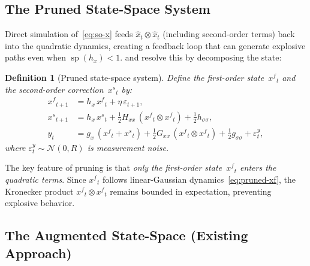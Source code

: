 \documentclass[12pt,a4paper]{article}
\newtheorem{definition}[theorem]{Definition}
\newcommand{\kron}{\otimes}
\newcommand{\xf}{{x^{f}}}
\newcommand{\xs}{{x^{s}}}
\newcommand{\gx}{g_x}
\newcommand{\hx}{h_x}
\newcommand{\Gxx}{G_{xx}}
\newcommand{\Hxx}{H_{xx}}
\newcommand{\gss}{{g_{\sigma\sigma}}}
\newcommand{\hsig}{{h_{\sigma\sigma}}}
\DeclareMathOperator{\specrad}{sp}
\begin{document}
\subsection{The Pruned State-Space System}\label{sec:pruned-ss}

Direct simulation of~\eqref{eq:so-x} feeds
$\hat{x}_t \kron \hat{x}_t$ (including second-order terms) back into
the quadratic dynamics, creating a feedback loop that can generate
explosive paths even when $\specrad(\hx) < 1$.
\citet{kim2008calculating} and \citet{andreasen2018pruned} resolve
this by decomposing the state:

\begin{definition}[Pruned state-space system]\label{def:pruned}
Define the first-order state~$\xf_t$ and the second-order
correction~$\xs_t$ by:
\begin{align}
\xf_{t+1} &= \hx\,\xf_t + \eta\,\varepsilon_{t+1},
  \label{eq:pruned-xf} \\
\xs_{t+1} &= \hx\,\xs_t
  + \tfrac{1}{2}\Hxx\,(\xf_t \kron \xf_t)
  + \tfrac{1}{2}\hsig,
  \label{eq:pruned-xs} \\
y_t &= \gx\,(\xf_t + \xs_t)
  + \tfrac{1}{2}\Gxx\,(\xf_t \kron \xf_t)
  + \tfrac{1}{2}\gss + \varepsilon_t^y,
  \label{eq:pruned-obs}
\end{align}
where $\varepsilon_t^y \sim \mathcal{N}(0, R)$ is measurement noise.
\end{definition}

\noindent
The key feature of pruning is that \emph{only the first-order
state~$\xf_t$ enters the quadratic terms}. Since $\xf_t$ follows
linear-Gaussian dynamics~\eqref{eq:pruned-xf}, the Kronecker product
$\xf_t \kron \xf_t$ remains bounded in expectation, preventing
explosive behavior.

\subsection{The Augmented State-Space (Existing Approach)}\label{sec:augmented}
\end{document}
